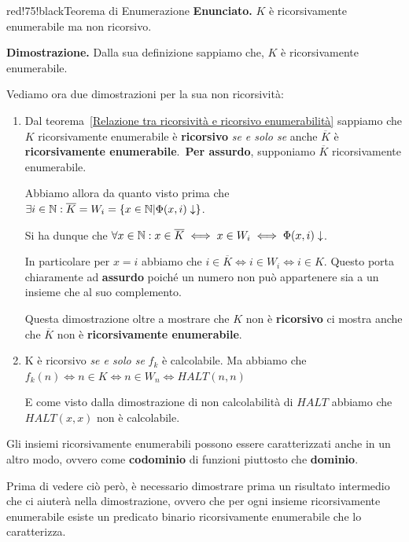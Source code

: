 \begin{halfframedbox}{red!75!black}{Teorema di Enumerazione}
  \textbf{Enunciato. } \(K\) è ricorsivamente enumerabile ma non ricorsivo.
  \begin{center}
    \textcolor{red!75!black}{\hdashrule[0.5ex]{18cm}{1pt}{3mm 3pt 1mm 2pt}}
  \end{center}
  \textbf{Dimostrazione. } Dalla sua definizione sappiamo che, \(K\) è ricorsivamente enumerabile.

  Vediamo ora due dimostrazioni per la sua non ricorsività:
  \begin{enumerate}
    \item Dal teorema~\ref{Relazione tra ricorsività e ricorsivo enumerabilità} sappiamo che \(K\) ricorsivamente enumerabile è \textbf{ricorsivo} \textit{se e solo se} anche \(\overline{K}\) è \textbf{ricorsivamente enumerabile}.\ \textbf{Per assurdo}, supponiamo \(\overline{K}\) ricorsivamente enumerabile.

    Abbiamo allora da quanto visto prima che \(\exists i \in \mathbb{N}: \overline{K}=W_i=\displaystyle{\left\{{ x \in \mathbb{N}\vert \Phi(x,i)\downarrow}\right\}}\).

    Si ha dunque che \(\forall x \in \mathbb{N}: x \in \overline{K} \iff x \in W_i \iff \Phi(x,i)\downarrow\).

    In particolare per \(x = i\) abbiamo che \(i \in \overline{K} \iff i \in W_i \iff i \in K\). Questo porta chiaramente ad \textbf{assurdo} poiché un numero non può appartenere sia a un insieme che al suo complemento.

    Questa dimostrazione oltre a mostrare che \(K\) non è \textbf{ricorsivo} ci mostra anche che \(\overline{K}\) non è \textbf{ricorsivamente enumerabile}.

    \item K è ricorsivo \textit{se e solo se} \(f_k\) è calcolabile. Ma abbiamo che \(f_k(n) \iff n \in K \iff n \in W_n \iff \textit{HALT}(n,n)\)

    E come visto dalla dimostrazione di non calcolabilità di \(\textit{HALT}\) abbiamo che \(\textit{HALT}(x,x)\) non è calcolabile.
  \end{enumerate}
\end{halfframedbox}

Gli insiemi ricorsivamente enumerabili possono essere caratterizzati anche in un altro modo, ovvero come \textbf{codominio} di funzioni piuttosto che \textbf{dominio}.

Prima di vedere ciò però, è necessario dimostrare prima un risultato intermedio che ci aiuterà nella dimostrazione, ovvero che per ogni insieme ricorsivamente enumerabile esiste un predicato binario ricorsivamente enumerabile che lo caratterizza.

